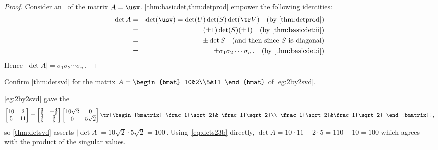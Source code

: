 \begin{proof} 
Consider an \svd\ of the matrix \(A=\usv\).
\cref{thm:basicdet,thm:detprod} empower the following identities:
\begin{eqnarray*}
\det A&=&\det(\usv)
=\det(U)\det(S)\det(\tr V)
\quad(\text{by \cref{thm:detprod}})
\\&=&(\pm 1)\det(S)(\pm 1)
\quad(\text{by \cref{thm:basicdet:ii}})
\\&=&\pm \det S
\quad(\text{and then since \(S\) is diagonal})
\\&=&\pm \sigma_1\sigma_2\cdots\sigma_n\,.
\quad(\text{by \cref{thm:basicdet:i}})
\end{eqnarray*}
Hence \(|\det A|=\sigma_1\sigma_2\cdots\sigma_n\)\,.
\end{proof}

\begin{example} 
Confirm \cref{thm:detsvd} for the matrix \(A=\begin{bmat} 10&2\\5&11 \end{bmat}\) of \cref{eg:2by2svd}.
\begin{solution} 
\cref{eg:2by2svd} gave the \svd
\begin{equation*}
\begin{bmatrix} 10&2\\5&11 \end{bmatrix}=
\begin{bmatrix} \frac35&-\frac45\\\frac45&\frac35 \end{bmatrix}
\begin{bmatrix} 10\sqrt2&0\\0&5\sqrt2 \end{bmatrix}
\tr{\begin{bmatrix} \frac1{\sqrt2}&-\frac1{\sqrt2}\\ \frac1{\sqrt2}&\frac1{\sqrt2} \end{bmatrix}},
\end{equation*}
so \cref{thm:detsvd} asserts \(|\det A|=10\sqrt2\cdot5\sqrt 2=100\)\,.
Using~\eqref{eq:dets23b} directly, \(\det A=10\cdot11-2\cdot 5=110-10=100\) which agrees with the product of the singular values.
\end{solution}
\end{example}






